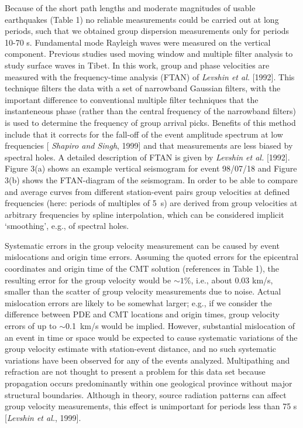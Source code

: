 \documentclass[12pt]{article}
\begin{document}
Because of the short path lengths and moderate magnitudes of usable earthquakes (Table 1) no reliable 
measurements could be carried out at long periods, such that we obtained group dispersion measurements 
only for periods 10-70 s.  Fundamental mode Rayleigh waves were measured on the vertical component. Previous 
studies used moving window and multiple filter analysis to study surface waves in Tibet.  In this work, 
group and phase velocities are measured with the frequency-time analysis (FTAN) of {\it Levshin et al.} 
[1992].  This technique filters the data with a set of narrowband
Gaussian filters, with the important difference to conventional
multiple filter techniques that the instanteneous phase (rather than
the central frequency of the narrowband filters) is used to
determine the frequency of group arrival picks.  Benefits of this 
method include that it corrects for the fall-off of the event amplitude spectrum at low frequencies [{\it 
Shapiro and Singh}, 1999] and that measurements are less biased by
spectral holes.  A detailed description of FTAN is given by {\it Levshin et al.} [1992].  Figure 
3(a) shows an example vertical seismogram for event 98/07/18 and Figure 3(b) shows the FTAN-diagram of the 
seismogram.  In order to be able to compare and average curves
from different station-event pairs group velocities at defined
frequencies (here: periods of multiples of 5~s) are derived from group 
velocities at arbitrary frequencies by spline interpolation, which can 
be considered implicit `smoothing', e.g., of spectral holes.

Systematic errors in the group velocity measurement can be caused by event mislocations and origin time 
errors.  Assuming the quoted errors for the epicentral coordinates and
origin time of the CMT solution (references in Table 1), the 
resulting error for the group velocity would be $\sim1\%$, i.e., about 0.03 km/s, smaller than the scatter 
of group velocity measurements due to noise.  Actual mislocation errors are
likely to be somewhat larger; e.g., if we consider the difference
between PDE and CMT locations and origin times, group velocity errors
of up to $\sim$0.1~km/s would be implied.  However, substantial mislocation of an event in time or 
space would be expected to cause systematic variations of the group velocity estimate with station-event 
distance, and no such systematic variations have been observed for any of the events analyzed.  
Multipathing and refraction are not thought to present a problem for this data set because propagation 
occurs predominantly within one geological province without major structural boundaries. Although in 
theory, source radiation patterns can affect group velocity measurements, this effect is unimportant for 
periods less than 75 s [{\it Levshin et al.}, 1999]. 
\end{document}
